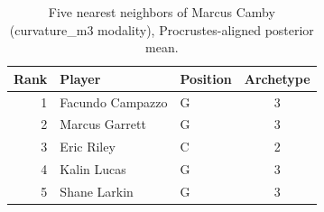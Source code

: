 \begin{table}[htbp]
  \centering\small
  \begin{tabular}{rllc}
    \toprule
    Rank & Player & Position & Archetype \\
    \midrule
    1 & Facundo Campazzo & G & 3 \\
    2 & Marcus Garrett & G & 3 \\
    3 & Eric Riley & C & 2 \\
    4 & Kalin Lucas & G & 3 \\
    5 & Shane Larkin & G & 3 \\
    \bottomrule
  \end{tabular}
  \caption{Five nearest neighbors of Marcus Camby (curvature_m3 modality), Procrustes-aligned posterior mean.}
  \label{tab:Marcus_Camby_neighbors_curvature_m3}
\end{table}

